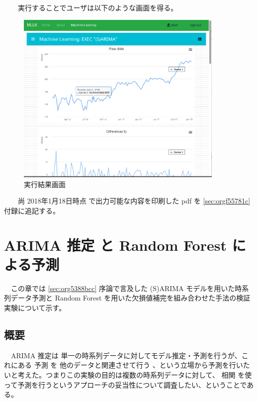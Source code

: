 \documentclass{scrartcl}
\begin{document}
　　実行することでユーザは以下のような画面を得る。\\
\begin{figure}[htbp]
\centering
\includegraphics[width=10cm]{./arima-view.PNG}
\caption{実行結果画面}
\end{figure}

　　尚 2018年1月18日時点 で出力可能な内容を印刷した pdf を \ref{sec:orgf55781c} 付録に追記する。\\
\newpage
\section{ARIMA 推定 と Random Forest による予測}
\label{sec:org26d20d0}
　この章では \ref{sec:org5388bcc} 序論で言及した (S)ARIMA モデルを用いた時系列データ予測と Random Forest を用いた欠損値補完を組み合わせた手法の検証実験について示す。\\
\subsection{概要}
\label{sec:orga756cba}

　ARIMA 推定は 単一の時系列データに対してモデル推定・予測を行うが、これにある 予測 を 他のデータと関連させて行う 、という立場から予測を行いたいと考えた。つまりこの実験の目的は複数の時系列データに対して、 相関 を使って予測を行うというアプローチの妥当性について調査したい、ということである。\\
\end{document}
